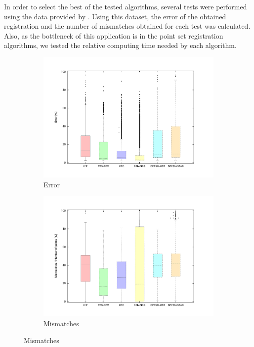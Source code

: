 In order to select the best of the tested algorithms, several tests were performed using the data provided by 
\cite{chui2000new}. Using this dataset, the error of the obtained registration and the number of mismatches obtained for 
each test was calculated. Also, as the bottleneck of this application is in the point set registration algorithms, we 
tested the relative computing time needed by each algorithm.

\begin{figure}[t]
        \centering
        \begin{subfigure}[b]{0.45\columnwidth}
                \centering
                \includegraphics[width=\textwidth, trim=50 40 80 50,clip]{fig18.pdf}
                \caption{Error}
                \label{fig:cp02_errorChart}
        \end{subfigure}%
        \begin{subfigure}[b]{0.45\columnwidth}
                \centering
                \includegraphics[width=\textwidth, trim=50 40 80 50,clip]{fig19.pdf}
                \caption{Mismatches}
                \label{fig:cp02_mismatchesChart}
        \end{subfigure}%
        

\end{figure}
